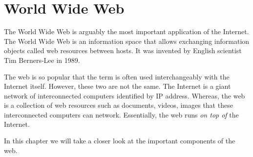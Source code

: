 \chapter{World Wide Web}
\label{chap:www}
The World Wide Web is arguably the most important application of the
Internet. The World Wide Web is an information space that allows
exchanging information objects called web resources between hosts. It
was invented by English scientist Tim Berners-Lee in 1989.

The web is so popular that the term is often used interchangeably with
the Internet itself. However, these two are not the same. The Internet
is a giant network of interconnected computers identified by IP
address. Whereas, the web is a collection of web resources such as
documents, videos, images that these interconnected computers can
network. Essentially, the web runs \emph{on top of} the Internet.

In this chapter we will take a closer look at the important components
of the web.

